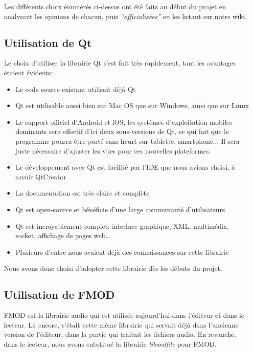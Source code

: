 Les différents choix énumérés ci-dessus ont été faits au début du projet en analysant les opinions de chacun, puis \textit{``officialisées''} en les listant sur notre wiki.


\subsection{Utilisation de Qt}

Le choix d'utiliser la librairie Qt s'est fait très rapidement, tant les avantages étaient évidents:
\begin{itemize}
 \item Le code source existant utilisait déjà Qt
 \item Qt est utilisable aussi bien sur Mac OS que sur Windows, ainsi que sur Linux
 \item Le support officiel d'Android et iOS, les systèmes d'exploitation mobiles dominants sera effectif d'ici deux sous-versions de Qt,
 ce qui fait que le programme pourra être porté sans heurt sur tablette, smartphone... Il sera juste nécessaire d'ajuster les vues pour
 ces nouvelles plateformes.
 \item Le développement avec Qt est facilité par l'IDE que nous avions choisi, à savoir QtCreator
 \item La documentation est très claire et complète
 \item Qt est open-source et bénéficie d'une large communauté d'utilisateurs
 \item Qt est incroyablement complet: interface graphique, XML, multimédia, socket, affichage de pages web\dots
 \item Plusieurs d'entre-nous avaient déjà des connaissances sur cette librairie
\end{itemize}

Nous avons donc choisi d'adopter cette librairie dès les débuts du projet.

\subsection{Utilisation de FMOD}

FMOD est la librairie audio qui est utilisée aujourd'hui dans l'éditeur et dans le lecteur. Là encore, c'était cette même librairie qui servait déjà dans l'ancienne version de l'éditeur, dans la partie qui traitait les fichiers audio. En revanche, dans le lecteur, nous avons substitué la librairie \textit{libsndfile} pour FMOD.

